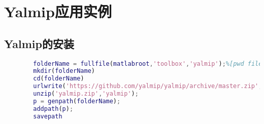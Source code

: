 \section{Yalmip应用实例}
    \subsection{Yalmip的安装}
        \begin{lstlisting}[language = Matlab]
        %% Installation YALMIP
        folderName = fullfile(matlabroot,'toolbox','yalmip');%[pwd filesep 'yalmip']
        mkdir(folderName)
        cd(folderName)
        urlwrite('https://github.com/yalmip/yalmip/archive/master.zip','yalmip.zip');
        unzip('yalmip.zip','yalmip');
        p = genpath(folderName);
        addpath(p);
        savepath
        \end{lstlisting}
